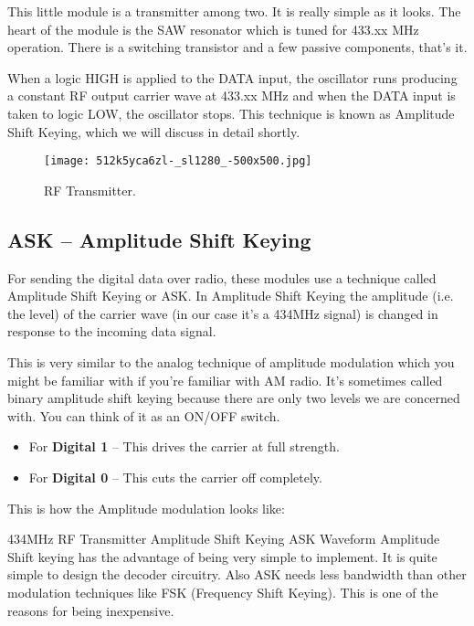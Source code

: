 This little module is a transmitter among two. It is really simple as it looks. The heart of the module is the SAW resonator which is tuned for 433.xx MHz operation. There is a switching transistor and a few passive components, that’s it.

When a logic HIGH is applied to the DATA input, the oscillator runs producing a constant RF output carrier wave at 433.xx MHz and when the DATA input is taken to logic LOW, the oscillator stops. This technique is known as Amplitude Shift Keying, which we will discuss in detail shortly.

\begin{figure}[h]
	\centering
	\texttt{[image: 512k5yca6zl-\_sl1280\_-500x500.jpg]}
	\caption{RF Transmitter.}
\end{figure}

\subsection{ASK – Amplitude Shift Keying}
For sending the digital data over radio, these modules use a technique called Amplitude Shift Keying or ASK. In Amplitude Shift Keying the amplitude (i.e. the level) of the carrier wave (in our case it’s a 434MHz signal) is changed in response to the incoming data signal.\vspace{.3cm}

This is very similar to the analog technique of amplitude modulation which you might be familiar with if you’re familiar with AM radio. It’s sometimes called binary amplitude shift keying because there are only two levels we are concerned with. You can think of it as an ON/OFF switch.\vspace{.3cm}
\begin{itemize}
	\item For \textbf{Digital 1} – This drives the carrier at full strength.
	\item For\textbf{ Digital 0} – This cuts the carrier off completely.
\end{itemize}
\vspace{.3cm}

This is how the Amplitude modulation looks like:

434MHz RF Transmitter Amplitude Shift Keying ASK Waveform
Amplitude Shift keying has the advantage of being very simple to implement. It is quite simple to design the decoder circuitry. Also ASK needs less bandwidth than other modulation techniques like FSK (Frequency Shift Keying). This is one of the reasons for being inexpensive.\vspace{.3cm}


